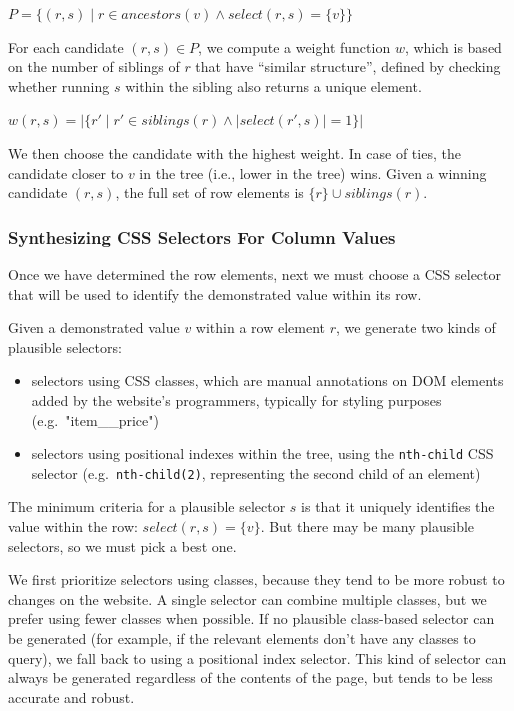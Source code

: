 \documentclass[sigconf,10pt]{acmart}
\providecommand{\tightlist}{%
  \setlength{\itemsep}{0pt}\setlength{\parskip}{0pt}}
\begin{document}
\(P = \{ (r, s) \mid r \in ancestors(v) \land select(r, s) = \{v\} \}\)

For each candidate \((r, s) \in P\), we compute a weight function \(w\),
which is based on the number of siblings of \(r\) that have ``similar
structure'', defined by checking whether running \(s\) within the
sibling also returns a unique element.

\(w(r, s) = |\{ r' \mid r' \in siblings(r) \land |select(r', s) | = 1 \}|\)

We then choose the candidate with the highest weight. In case of ties,
the candidate closer to \(v\) in the tree (i.e., lower in the tree)
wins. Given a winning candidate \((r, s)\), the full set of row elements
is \(\{r\} \cup siblings(r)\).

\hypertarget{synthesizing-css-selectors-for-column-values}{%
\subsubsection*{Synthesizing CSS Selectors For Column
Values}\label{synthesizing-css-selectors-for-column-values}}

Once we have determined the row elements, next we must choose a CSS
selector that will be used to identify the demonstrated value within its
row.

Given a demonstrated value \(v\) within a row element \(r\), we generate
two kinds of plausible selectors:

\begin{itemize}
\tightlist
\item
  selectors using CSS classes, which are manual annotations on DOM
  elements added by the website's programmers, typically for styling
  purposes (e.g.~"item\_\_price")
\item
  selectors using positional indexes within the tree, using the
  \texttt{nth-child} CSS selector (e.g.~\texttt{nth-child(2)},
  representing the second child of an element)
\end{itemize}

The minimum criteria for a plausible selector \(s\) is that it uniquely
identifies the value within the row: \(select(r, s) = \{v\}\). But there
may be many plausible selectors, so we must pick a best one.

We first prioritize selectors using classes, because they tend to be
more robust to changes on the website. A single selector can combine
multiple classes, but we prefer using fewer classes when possible. If no
plausible class-based selector can be generated (for example, if the
relevant elements don't have any classes to query), we fall back to
using a positional index selector. This kind of selector can always be
generated regardless of the contents of the page, but tends to be less
accurate and robust.
\end{document}
